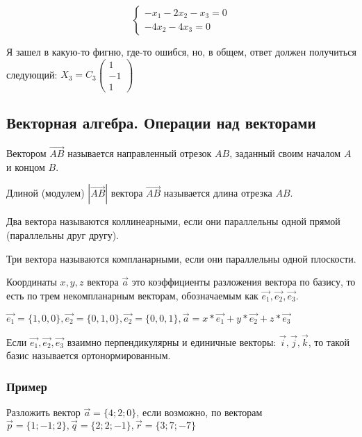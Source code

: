 \documentclass{article}
\begin{document}
\begin{equation}
    \begin{cases}
        -x_1 - 2x_2 - x_3 = 0 \\
        -4x_2 - 4x_3 = 0
    \end{cases}
\end{equation}

Я зашел в какую-то фигню, где-то ошибся, но, в общем, ответ должен получиться следующий: $X_3 = C_3 \begin{pmatrix}
    1 \\
    -1 \\
    1
\end{pmatrix}$

\subsection{Векторная алгебра. Операции над векторами}

Вектором $\overrightarrow{AB}$ называется направленный отрезок $AB$, заданный своим началом $A$ и концом $B$.

Длиной (модулем) $|\overrightarrow{AB}|$ вектора $\overrightarrow{AB}$ называется длина отрезка $AB$.

Два вектора называются коллинеарными, если они параллельны одной прямой (параллельны друг другу).

Три вектора называются компланарными, если они параллельны одной плоскости.

Координаты $x, y, z$ вектора $\overrightarrow{a}$ это коэффициенты разложения вектора по базису, то есть по трем некомпланарным векторам, обозначаемым как $\overrightarrow{e_1}, \overrightarrow{e_2}, \overrightarrow{e_3}$.

$\overrightarrow{e_1} = \{1, 0, 0\}, \overrightarrow{e_2} = \{0, 1, 0\}, \overrightarrow{e_2} = \{0, 0, 1\}, \overrightarrow{a} = x * \overrightarrow{e_1} + y * \overrightarrow{e_2} + z * \overrightarrow{e_3}$

Если $\overrightarrow{e_1}, \overrightarrow{e_2}, \overrightarrow{e_3}$ взаимно перпендикулярны и единичные векторы: $\overrightarrow{i}, \overrightarrow{j}, \overrightarrow{k}$, то такой базис называется ортонормированным.

\subsubsection{Пример}

Разложить вектор $\overrightarrow{a} = \{4; 2; 0\}$, если возможно, по векторам $\overrightarrow{p} = \{1; -1; 2\}, \overrightarrow{q} = \{2; 2; -1\}, \overrightarrow{r} = \{3; 7; -7\}$ 
\end{document}
